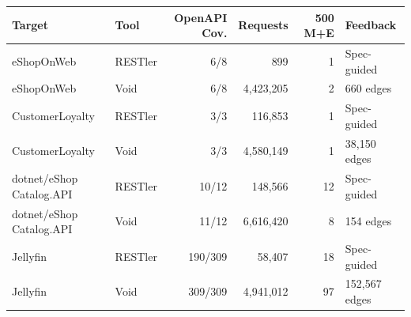 \begin{tabular}{llrrrl}
\toprule
\textbf{Target} & \textbf{Tool} & \textbf{OpenAPI Cov.} & \textbf{Requests} & \textbf{500 M+E} & \textbf{Feedback} \\
\midrule
eShopOnWeb & RESTler & 6/8 & 899 & 1 & Spec-guided \\
eShopOnWeb & Void & 6/8 & 4,423,205 & 2 & 660 edges \\
CustomerLoyalty & RESTler & 3/3 & 116,853 & 1 & Spec-guided \\
CustomerLoyalty & Void & 3/3 & 4,580,149 & 1 & 38,150 edges \\
dotnet/eShop Catalog.API & RESTler & 10/12 & 148,566 & 12 & Spec-guided \\
dotnet/eShop Catalog.API & Void & 11/12 & 6,616,420 & 8 & 154 edges \\
Jellyfin & RESTler & 190/309 & 58,407 & 18 & Spec-guided \\
Jellyfin & Void & 309/309 & 4,941,012 & 97 & 152,567 edges \\
\bottomrule
\end{tabular}
